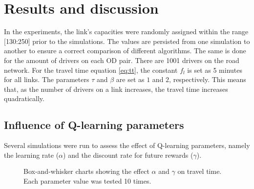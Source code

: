 \documentclass[12pt]{llncs}
\newcommand{\fftt}{\ensuremath{f_l}} 		%
\begin{document}
\section{Results and discussion}
\label{sec:results}

In the experiments, the link's capacities were randomly assigned within the range [130:250] prior to the simulations. The values are persisted from one simulation to another to ensure a correct comparison of different algorithms. The same is done for the amount of drivers on each OD pair. There are 1001 drivers on the road network. For the travel time equation \eqref{eq:tt}, the
constant $\fftt$ is set as 5 minutes for all links. The parameters  $\tau$ and $\beta$ are set as $1$ and $2$, respectively. This means that, as the number of drivers on a link increases, the travel time increases quadratically. 

\subsection{Influence of Q-learning parameters}

Several simulations were run to assess the effect of Q-learning parameters, namely the learning rate ($\alpha$) and the discount rate for future rewards ($\gamma$).

\begin{figure}[ht]
  \centering
  \caption{Box-and-whisker charts showing the effect $\alpha$ and $\gamma$ on travel time. Each parameter value was tested 10 times.}
  \label{fig:qLearningParams}
\end{figure}
\end{document}
